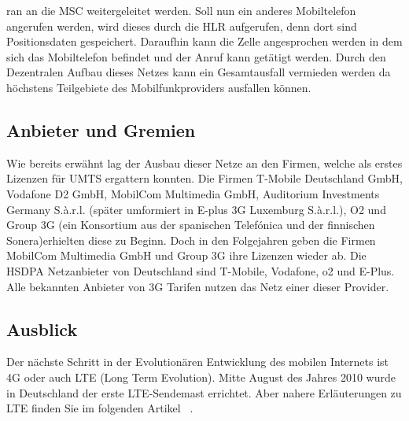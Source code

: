 \begin{multicols}{3}


ran an die MSC weitergeleitet werden. Soll nun ein anderes Mobiltelefon angerufen werden, wird dieses durch die HLR aufgerufen, denn dort sind Positionsdaten gespeichert. Daraufhin kann die Zelle angesprochen werden in dem sich das Mobiltelefon befindet und der Anruf kann getätigt werden. 
Durch den Dezentralen Aufbau dieses Netzes kann ein Gesamtausfall vermieden werden da höchstens Teilgebiete des Mobilfunkproviders ausfallen können. ~\cite{3G.1}

\subsection*{Anbieter und Gremien}
Wie bereits erwähnt lag der Ausbau dieser Netze an den Firmen, welche als erstes Lizenzen für UMTS ergattern konnten. Die Firmen T-Mobile Deutschland GmbH, Vodafone D2 GmbH, MobilCom Multimedia GmbH, Auditorium Investments Germany S.à.r.l. (später umformiert in E-plus 3G Luxemburg S.à.r.l.), O2 und Group 3G (ein Konsortium aus der spanischen Telefónica und der finnischen Sonera)erhielten diese zu Beginn.  Doch in den Folgejahren geben die Firmen MobilCom Multimedia GmbH und Group 3G ihre Lizenzen wieder ab.
Die HSDPA Netzanbieter von Deutschland sind T-Mobile, Vodafone, o2 und E-Plus. Alle bekannten Anbieter von 3G Tarifen nutzen das Netz einer dieser Provider. 
~\cite{3G.1, 3G.2}

\subsection*{Ausblick}
Der nächste Schritt in der Evolutionären Entwicklung des mobilen Internets ist 4G oder auch LTE (Long Term Evolution). Mitte August des Jahres 2010 wurde in Deutschland der erste LTE-Sendemast errichtet. Aber nahere Erläuterungen zu LTE finden Sie im folgenden Artikel ~\cite{3G.2}.


\printbibliography[segment=8,heading=subbibliography]
\end{multicols}



\newpage
